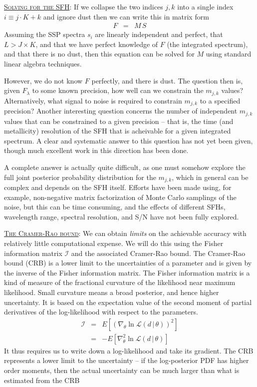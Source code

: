 \documentclass{article}
\newcommand{\given}{\,|\,}
\begin{document}
\vspace{0.15in}

\underline{\textsc{Solving for the SFH}}:
If we collapse the two indices $j, k$ into a single index $i \equiv j\cdot K + k$ and ignore dust then we can write this in matrix form
\begin{eqnarray}
F & = & M \, S
\end{eqnarray}
Assuming the SSP spectra $s_{i}$ are linearly independent and perfect, that $L > J\times K$, and that we have perfect knowledge of $F$ (the integrated spectrum), and that there is no dust, 
then this equation can be solved for $M$ using standard linear algebra techniques.

However, we do not know $F$ perfectly, and there is dust. 
The question then is, given $F_\lambda$ to some known precision, how well can we constrain the $m_{j,k}$ values? 
Alternatively, what signal to noise is required to constrain $m_{j,k}$ to a specified precision?
Another interesting question concerns the number of independent $m_{j,k}$ values that can be constrained to a given precision -- 
that is, the time (and metallicity) resolution of the SFH that is acheivable for a given integrated spectrum.
A clear and systematic answer to this question has not yet been given, though much excellent work in this direction has been done.

A complete answer is actually quite difficult, as one must somehow explore the full joint posterior probability distribution for the $m_{j,k}$, 
which in general can be complex and depends on the SFH itself.
Efforts have been made using, for example, non-negative matrix factorization of Monte Carlo samplings of the noise, 
but this can be time consuming, and the effects of different SFHs, wavelength range, spectral resolution, and S/N have not been fully explored.

\vspace{0.15in}

\underline{\textsc{The Cramer-Rao bound}}:
We can obtain \emph{limits} on the achievable accuracy with relatively little computational expense.
We will do this using the Fisher information matrix $\mathcal{I}$ and the associated Cramer-Rao bound.
The Cramer-Rao bound (CRB) is a lower limit to the uncertainties of a parameter and is given by the inverse of the Fisher information matrix.
The Fisher information matrix is a kind of measure of the fractional curvature of the likelihood near maximum likelihood. 
Small curvature means a broad posterior, and hence higher uncertainty.
It is based on the  expectation value of the second moment of partial derivatives of the log-likelihood with respect to the parameters.
\begin{eqnarray}
\mathcal{I} & = & E\left[\left(\nabla_\theta \ln \mathcal{L}(d \given \theta)\right)^2\right] \\
 & = & -E\left[\nabla^2_\theta \ln \mathcal{L}(d \given \theta)\right]
\end{eqnarray}
It thus requires us to write down a log-likelihood and take its gradient.
The CRB represents a lower limit to the uncertainty -- 
if the log-posterior PDF has higher order moments, then the actual uncertainty can be much larger than what is estimated from the CRB
\end{document}
